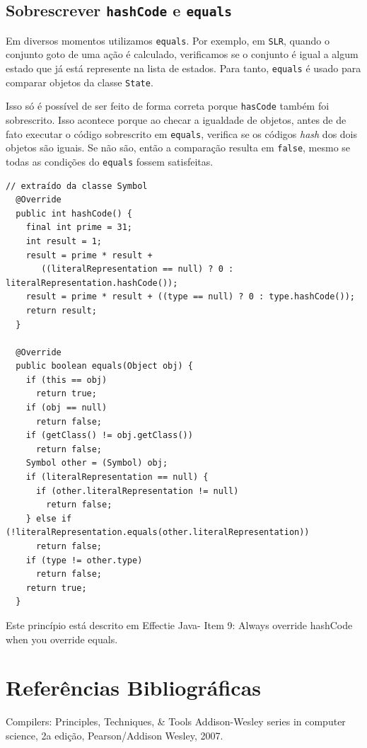 \documentclass[11pt]{article}
\begin{document}
\subsection{Sobrescrever \texttt{hashCode} e \texttt{equals}}
\label{sec:orgheadline22}
Em diversos momentos utilizamos \texttt{equals}. Por exemplo, em \texttt{SLR}, quando 
o conjunto goto de uma ação é calculado, verificamos se o conjunto é igual a algum
estado que já está represente na lista de estados. Para tanto, \texttt{equals} é usado
para comparar objetos da classe \texttt{State}.

Isso só é possível de ser feito de forma correta porque \texttt{hasCode} também foi
sobrescrito. Isso acontece porque ao checar a igualdade de objetos, antes de
de fato executar o código sobrescrito em \texttt{equals}, verifica se os códigos \emph{hash}
dos dois objetos são iguais. Se não são, então a comparação resulta em \texttt{false},
mesmo se todas as condições do \texttt{equals} fossem satisfeitas.

\begin{verbatim}
// extraído da classe Symbol
  @Override
  public int hashCode() {
    final int prime = 31;
    int result = 1;
    result = prime * result + 
       ((literalRepresentation == null) ? 0 : literalRepresentation.hashCode());
    result = prime * result + ((type == null) ? 0 : type.hashCode());
    return result;
  }

  @Override
  public boolean equals(Object obj) {
    if (this == obj)
      return true;
    if (obj == null)
      return false;
    if (getClass() != obj.getClass())
      return false;
    Symbol other = (Symbol) obj;
    if (literalRepresentation == null) {
      if (other.literalRepresentation != null)
        return false;
    } else if (!literalRepresentation.equals(other.literalRepresentation))
      return false;
    if (type != other.type)
      return false;
    return true;
  }
\end{verbatim}

Este princípio está descrito em Effectie Java- Item 9: Always override hashCode when you override equals.

\section{Referências Bibliográficas}
\label{sec:orgheadline23}
Compilers: Principles, Techniques, \& Tools Addison-Wesley series in computer science, 2a edição, Pearson/Addison Wesley, 2007.
\end{document}
